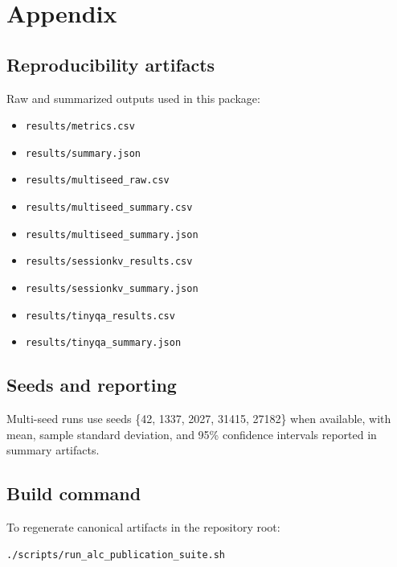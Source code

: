 \section{Appendix}
\subsection{Reproducibility artifacts}
Raw and summarized outputs used in this package:
\begin{itemize}
  \item \texttt{results/metrics.csv}
  \item \texttt{results/summary.json}
  \item \texttt{results/multiseed\_raw.csv}
  \item \texttt{results/multiseed\_summary.csv}
  \item \texttt{results/multiseed\_summary.json}
  \item \texttt{results/sessionkv\_results.csv}
  \item \texttt{results/sessionkv\_summary.json}
  \item \texttt{results/tinyqa\_results.csv}
  \item \texttt{results/tinyqa\_summary.json}
\end{itemize}

\subsection{Seeds and reporting}
Multi-seed runs use seeds \{42, 1337, 2027, 31415, 27182\} when available, with mean, sample standard deviation, and 95\% confidence intervals reported in summary artifacts.

\subsection{Build command}
To regenerate canonical artifacts in the repository root:
\begin{verbatim}
./scripts/run_alc_publication_suite.sh
\end{verbatim}
